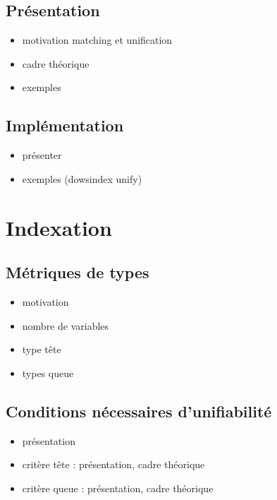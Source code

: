 \documentclass [a4paper] {report}
\theoremstyle {definition}
\begin{document}
\section {Présentation}

\begin {itemize}
	\item motivation matching et unification
	\item cadre théorique
	\item exemples
\end {itemize}

\section {Implémentation}

\begin {itemize}
	\item présenter \cite {boudet}
	\item exemples (dowsindex unify)
\end {itemize}


\chapter {Indexation}

\section {Métriques de types}

\begin {itemize}
	\item motivation
	\item nombre de variables
	\item type tête
	\item types queue	
\end {itemize}

\section {Conditions nécessaires d'unifiabilité}

\begin {itemize}
	\item présentation
	\item critère tête : présentation, cadre théorique
	\item critère queue : présentation, cadre théorique
\end {itemize}
\end{document}
